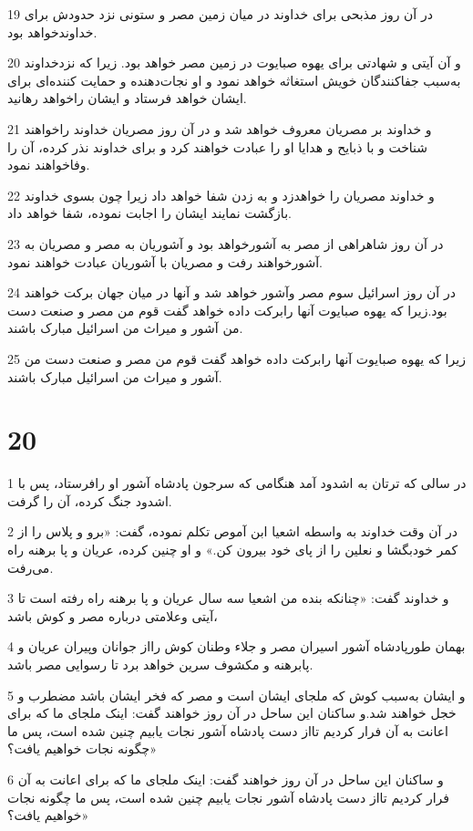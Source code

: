 \par 19 در آن روز مذبحی برای خداوند در میان زمین مصر و ستونی نزد حدودش برای خداوندخواهد بود.
\par 20 و آن آیتی و شهادتی برای یهوه صبایوت در زمین مصر خواهد بود. زیرا که نزدخداوند به‌سبب جفاکنندگان خویش استغاثه خواهد نمود و او نجات‌دهنده و حمایت کننده‌ای برای ایشان خواهد فرستاد و ایشان راخواهد رهانید.
\par 21 و خداوند بر مصریان معروف خواهد شد و در آن روز مصریان خداوند راخواهند شناخت و با ذبایح و هدایا او را عبادت خواهند کرد و برای خداوند نذر کرده، آن را وفاخواهند نمود.
\par 22 و خداوند مصریان را خواهدزد و به زدن شفا خواهد داد زیرا چون بسوی خداوند بازگشت نمایند ایشان را اجابت نموده، شفا خواهد داد.
\par 23 در آن روز شاهراهی از مصر به آشورخواهد بود و آشوریان به مصر و مصریان به آشورخواهند رفت و مصریان با آشوریان عبادت خواهند نمود.
\par 24 در آن روز اسرائیل سوم مصر وآشور خواهد شد و آنها در میان جهان برکت خواهند بود.زیرا که یهوه صبایوت آنها رابرکت داده خواهد گفت قوم من مصر و صنعت دست من آشور و میراث من اسرائیل مبارک باشند.
\par 25 زیرا که یهوه صبایوت آنها رابرکت داده خواهد گفت قوم من مصر و صنعت دست من آشور و میراث من اسرائیل مبارک باشند.
 
\chapter{20}

\par 1 در سالی که ترتان به اشدود آمد هنگامی که سرجون پادشاه آشور او رافرستاد، پس با اشدود جنگ کرده، آن را گرفت.
\par 2 در آن وقت خداوند به واسطه اشعیا ابن آموص تکلم نموده، گفت: «برو و پلاس را از کمر خودبگشا و نعلین را از پای خود بیرون کن.» و او چنین کرده، عریان و پا برهنه راه می‌رفت.
\par 3 و خداوند گفت: «چنانکه بنده من اشعیا سه سال عریان و پا برهنه راه رفته است تا آیتی وعلامتی درباره مصر و کوش باشد،
\par 4 بهمان طورپادشاه آشور اسیران مصر و جلاء وطنان کوش رااز جوانان وپیران عریان و پابرهنه و مکشوف سرین خواهد برد تا رسوایی مصر باشد.
\par 5 و ایشان به‌سبب کوش که ملجای ایشان است و مصر که فخر ایشان باشد مضطرب و خجل خواهند شد.و ساکنان این ساحل در آن روز خواهند گفت: اینک ملجای ما که برای اعانت به آن فرار کردیم تااز دست پادشاه آشور نجات یابیم چنین شده است، پس ما چگونه نجات خواهیم یافت؟»
\par 6 و ساکنان این ساحل در آن روز خواهند گفت: اینک ملجای ما که برای اعانت به آن فرار کردیم تااز دست پادشاه آشور نجات یابیم چنین شده است، پس ما چگونه نجات خواهیم یافت؟»
 
